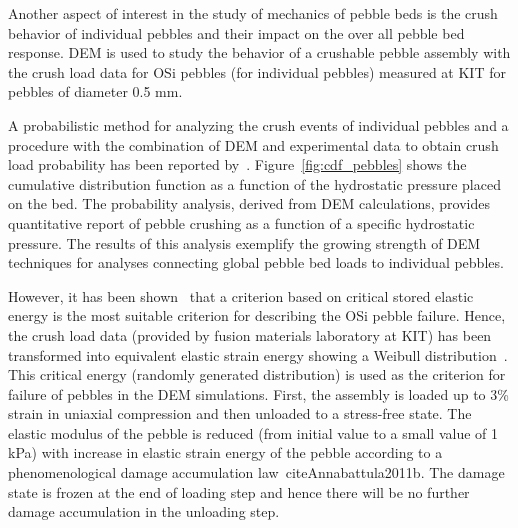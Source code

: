 Another aspect of interest in the study of mechanics of pebble beds is the crush behavior of individual pebbles and their impact on the over all pebble bed response. DEM is used to study the behavior of a crushable pebble assembly with the crush load data for OSi pebbles (for individual pebbles) measured at KIT for pebbles of diameter 0.5 mm. 

A probabilistic method for analyzing the crush events of individual pebbles and a procedure with the combination of DEM and experimental data to obtain crush load probability has been reported by~\cite{Gan:2010kc}. Figure~\ref{fig:cdf_pebbles} shows the cumulative distribution function as a function of the hydrostatic pressure placed on the bed. The probability analysis, derived from DEM calculations, provides quantitative report of pebble crushing as a function of a specific hydrostatic pressure. The results of this analysis exemplify the growing strength of DEM techniques for analyses connecting global pebble bed loads to individual pebbles.

However, it has been shown~\cite{Zhao2010,Zhao2011} that a criterion based on critical stored elastic energy is the most suitable criterion for describing the OSi pebble failure. Hence, the crush load data (provided by fusion materials laboratory at KIT) has been transformed into equivalent elastic strain energy showing a Weibull distribution~\cite{Zhao2010}. This critical energy (randomly generated distribution) is used as the criterion for failure of pebbles in the DEM simulations. First, the assembly is loaded up to 3\% strain in uniaxial compression and then unloaded to a stress-free state. The elastic modulus of the pebble is reduced (from initial value to a small value of 1 kPa) with increase in elastic strain energy of the pebble according to a phenomenological damage accumulation law~cite{Annabattula2011b}. The damage state is frozen at the end of loading step and hence there will be no further damage accumulation in the unloading step. 

